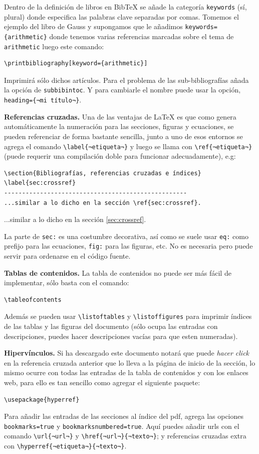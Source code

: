 Dentro de la definición de libros en Bib\TeX{} se añade la categoría \texttt{keywords} (sí, plural) donde especifica las palabras clave separadas por comas. Tomemos el ejemplo del libro de Gauss y supongamos que le añadimos \lstinline|keywords={arithmetic}| donde tenemos varias referencias marcadas sobre el tema de \texttt{arithmetic} luego este comando:
\begin{lstlisting}
\printbibliography[keyword={arithmetic}]
\end{lstlisting}
Imprimirá sólo dichos artículos. Para el problema de las sub-bibliografías añada la opción de \texttt{subbibintoc}. Y para cambiarle el nombre puede usar la opción, \lstinline|heading={¬mi título¬}|.

\textbf{Referencias cruzadas.} Una de las ventajas de \LaTeX{} es que como genera automáticamente la numeración para las secciones, figuras y ecuaciones, se pueden referenciar de forma bastante sencilla, junto a uno de esos entornos se agrega el comando \lstinline|\label{¬etiqueta¬}| y luego se llama con \lstinline|\ref{¬etiqueta¬}| (puede requerir una compilación doble para funcionar adecuadamente), e.g:
\begin{lstlisting}[basicstyle=\footnotesize\ttfamily]
\section{Bibliografías, referencias cruzadas e índices}
\label{sec:crossref}
---------------------------------------------------
...similar a lo dicho en la sección \ref{sec:crossref}.
\end{lstlisting}
...similar a lo dicho en la sección \ref{sec:crossref}.

La parte de \texttt{sec:} es una costumbre decorativa, así como se suele usar \texttt{eq:} como prefijo para las ecuaciones, \texttt{fig:} para las figuras, etc. No es necesaria pero puede servir para ordenarse en el código fuente.

\textbf{Tablas de contenidos.} La tabla de contenidos no puede ser más fácil de implementar, sólo basta con el comando:
\begin{lstlisting}
\tableofcontents
\end{lstlisting}
Además se pueden usar \lstinline|\listoftables| y \lstinline|\listoffigures| para imprimir índices de las tablas y las figuras del documento (sólo ocupa las entradas  con descripciones, puedes hacer descripciones vacías para que esten numeradas).

\textbf{Hipervínculos.} Si ha descargado este documento notará que puede \textit{hacer click} en la referencia cruzada anterior que lo lleva a la página de inicio de la sección, lo mismo ocurre con todas las entradas de la tabla de contenidos y con los enlaces web, para ello es tan sencillo como agregar el siguiente paquete:
\begin{lstlisting}
\usepackage{hyperref}
\end{lstlisting}
Para añadir las entradas de las secciones al índice del pdf, agrega las opciones \texttt{bookmarks=true} y \texttt{bookmarksnumbered=true}. Aquí puedes añadir urls con el comando \lstinline|\url{¬url¬}| y \lstinline|\href{¬url¬}{¬texto¬}|; y referencias cruzadas extra con \lstinline|\hyperref{¬etiqueta¬}{¬texto¬}|.

